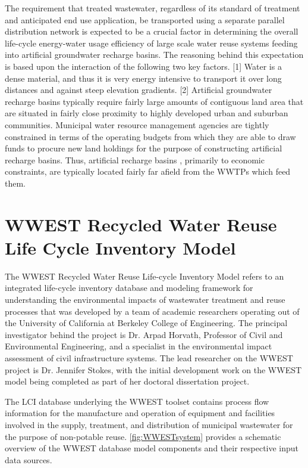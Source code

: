 The requirement that treated wastewater, regardless of its standard of treatment and anticipated end use application, be transported using a separate parallel distribution network is expected to be a crucial factor in determining the overall life-cycle energy-water usage efficiency of large scale water reuse systems feeding into artificial groundwater recharge basins. The reasoning behind this expectation is based upon the interaction of the following two key factors. [1] Water is a dense material, and thus it is very energy intensive to transport it over long distances and against steep elevation gradients. [2] Artificial groundwater recharge basins typically require fairly large amounts of contiguous land area that are situated in fairly close proximity to highly developed urban and suburban communities. Municipal water resource management agencies are tightly constrained in terms of the operating budgets from which they are able to draw funds to procure new land holdings for the purpose of constructing artificial recharge basins. Thus, artificial recharge basins , primarily to economic constraints, are typically located fairly far afield from the WWTPs which feed them.
 
\section{WWEST Recycled Water Reuse Life Cycle Inventory Model}

The WWEST Recycled Water Reuse Life-cycle Inventory Model refers to an integrated life-cycle inventory database and modeling framework for understanding the environmental impacts of wastewater treatment and reuse processes that was developed by a team of academic researchers operating out of the University of California at Berkeley College of Engineering. The principal investigator behind the project is Dr. Arpad Horvath, Professor of Civil and Environmental Engineering, and a specialist in the environmental impact assessment of civil infrastructure systems. The lead researcher on the WWEST project is Dr. Jennifer Stokes, with the initial development work on the WWEST model being completed as part of her doctoral dissertation project.

The LCI database underlying the WWEST toolset contains process flow information for the manufacture and operation of equipment and facilities involved in the supply, treatment, and distribution of municipal wastewater for the purpose of non-potable reuse. \ref{fig:WWESTsystem} 
provides a schematic overview of the WWEST database model components and their respective input data sources.

